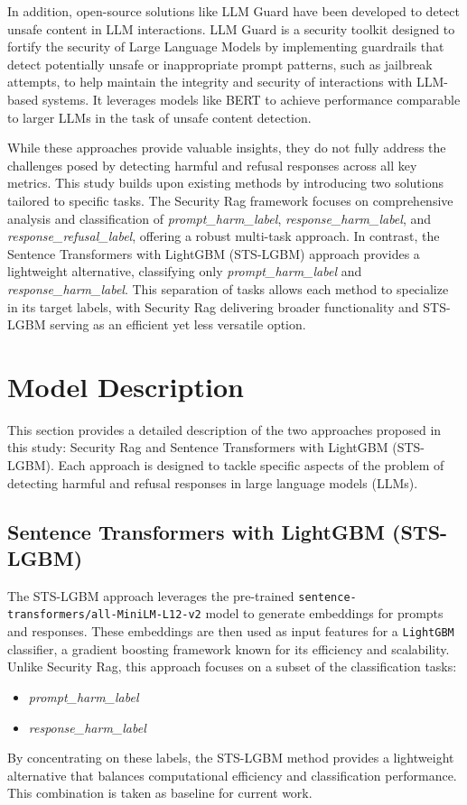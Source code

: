 \documentclass{article}
\begin{document}
In addition, open-source solutions like LLM Guard \cite{llmguard2023github} have been developed to detect unsafe content in LLM interactions. LLM Guard is a security toolkit designed to fortify the security of Large Language Models by implementing guardrails that detect potentially unsafe or inappropriate prompt patterns, such as jailbreak attempts, to help maintain the integrity and security of interactions with LLM-based systems. It leverages models like BERT to achieve performance comparable to larger LLMs in the task of unsafe content detection.

While these approaches provide valuable insights, they do not fully address the challenges posed by detecting harmful and refusal responses across all key metrics. This study builds upon existing methods by introducing two solutions tailored to specific tasks. The Security Rag framework focuses on comprehensive analysis and classification of \textit{prompt\_harm\_label}, \textit{response\_harm\_label}, and \textit{response\_refusal\_label}, offering a robust multi-task approach. In contrast, the Sentence Transformers with LightGBM (STS-LGBM) approach provides a lightweight alternative, classifying only \textit{prompt\_harm\_label} and \textit{response\_harm\_label}. This separation of tasks allows each method to specialize in its target labels, with Security Rag delivering broader functionality and STS-LGBM serving as an efficient yet less versatile option.




\section{Model Description}

This section provides a detailed description of the two approaches proposed in this study: Security Rag and Sentence Transformers with LightGBM (STS-LGBM). Each approach is designed to tackle specific aspects of the problem of detecting harmful and refusal responses in large language models (LLMs).

\subsection{Sentence Transformers with LightGBM (STS-LGBM)}

The STS-LGBM approach leverages the pre-trained \texttt{sentence-transformers/all-MiniLM-L12-v2} model to generate embeddings for prompts and responses. These embeddings are then used as input features for a \texttt{LightGBM} classifier, a gradient boosting framework known for its efficiency and scalability. Unlike Security Rag, this approach focuses on a subset of the classification tasks:
\begin{itemize}
    \item \textit{prompt\_harm\_label}
    \item \textit{response\_harm\_label}
\end{itemize}
By concentrating on these labels, the STS-LGBM method provides a lightweight alternative that balances computational efficiency and classification performance. This combination is taken as baseline for current work. 
\end{document}

